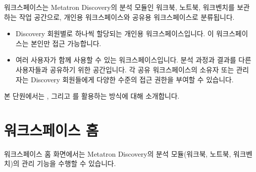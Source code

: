\documentclass[letterpaper,10pt,english]{sphinxmanual}
\begin{document}
워크스페이스는 Metatron Discovery의 분석 모듈인 워크북, 노트북, 워크벤치를 보관하는 작업 공간으로, 개인용 워크스페이스와 공유용 워크스페이스로 분류됩니다.
\begin{itemize}
\item {} 
 Discovery 회원별로 하나씩 할당되는 개인용 워크스페이스입니다. 이 워크스페이스는 본인만 접근 가능합니다.

\item {} 
 여러 사용자가 함께 사용할 수 있는 워크스페이스입니다. 분석 과정과 결과를 다른 사용자들과 공유하기 위한 공간입니다. 각 공유 워크스페이스의 소유자 또는 관리자는 Discovery 회원들에게 다양한 수준의 접근 권한을 부여할 수 있습니다.

\end{itemize}

본 단원에서는 , 그리고 를 활용하는 방식에 대해 소개합니다.


\section{워크스페이스 홈}
\label{\detokenize{discovery/part03/workspace_management:id1}}\label{\detokenize{discovery/part03/workspace_management::doc}}
워크스페이스 홈 화면에서는 Metatron Discovery의 분석 모듈(워크북, 노트북, 워크벤치)의 관리 기능을 수행할 수 있습니다.
\end{document}
